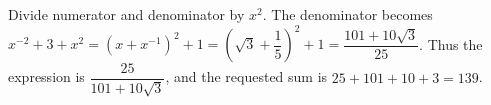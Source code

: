 Divide numerator and denominator by $x^2$. The denominator becomes $x^{-2}+3+x^2=(x+x^{-1})^2+1=(\sqrt3+\dfrac{1}{5})^2+1=\dfrac{101+10\sqrt3}{25}$. Thus the expression is $\dfrac{25}{101+10\sqrt3}$, and the requested sum is $25+101+10+3=\boxed{139}$.

